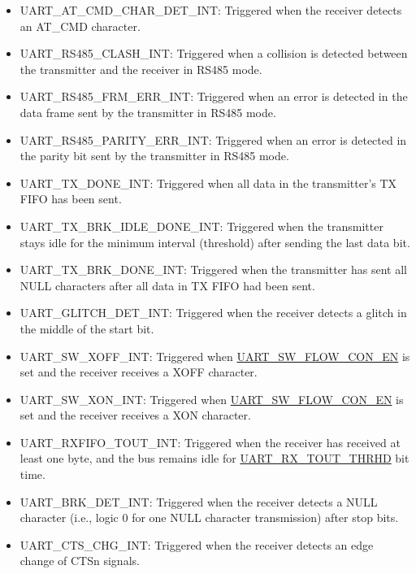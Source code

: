 \documentclass[main\_\_EN.tex]{subfiles}
\begin{document}
\begin{itemize}
\item \label{int:UARTATCMDCHARDETINT}UART\_AT\_CMD\_CHAR\_DET\_INT: Triggered when the receiver detects an AT\_CMD character.
\item \label{int:UARTRS485CLASHINT}UART\_RS485\_CLASH\_INT: Triggered when a collision is detected between the transmitter and the receiver in RS485 mode.
\item \label{int:UARTRS485FRMERRINT}UART\_RS485\_FRM\_ERR\_INT: Triggered when an error is detected in the data frame sent by the transmitter in RS485 mode.
\item \label{int:UARTRS485PARITYERRINT}UART\_RS485\_PARITY\_ERR\_INT: Triggered when an error is detected in the parity bit sent by the transmitter in RS485 mode.
\item \label{int:UARTTXDONEINT}UART\_TX\_DONE\_INT: Triggered when all data in the transmitter's TX FIFO has been sent.
\item \label{int:UARTTXBRKIDLEDONEINT}UART\_TX\_BRK\_IDLE\_DONE\_INT: Triggered when the transmitter stays idle for the minimum interval (threshold) after sending the last data bit.
\item \label{int:UARTTXBRKDONEINT}UART\_TX\_BRK\_DONE\_INT: Triggered when the transmitter has sent all NULL characters after all data in TX FIFO had been sent.
\item \label{int:UARTGLITCHDETINT}UART\_GLITCH\_DET\_INT: Triggered when the receiver detects a glitch in the middle of the start bit.
\item \label{int:UARTSWXOFFINT}UART\_SW\_XOFF\_INT: Triggered when \hyperref[fielddesc:UARTSWFLOWCONEN]{UART\_SW\_FLOW\_CON\_EN} is set and the receiver receives a XOFF character.
\item \label{int:UARTSWXONINT}UART\_SW\_XON\_INT: Triggered when \hyperref[fielddesc:UARTSWFLOWCONEN]{UART\_SW\_FLOW\_CON\_EN} is set and the receiver receives a XON character.
\item \label{int:UARTRXFIFOTOUTINT}UART\_RXFIFO\_TOUT\_INT: Triggered when the receiver has received at least one byte, and the bus remains idle for \hyperref[fielddesc:UARTRXTOUTTHRHD]{UART\_RX\_TOUT\_THRHD} bit time.
\item \label{int:UARTBRKDETINT}UART\_BRK\_DET\_INT: Triggered when the receiver detects a NULL character (i.e., logic 0 for one NULL character transmission) after stop bits.
\item \label{int:UARTCTSCHGINT}UART\_CTS\_CHG\_INT: Triggered when the receiver detects an edge change of CTSn signals.

\end{itemize}
\end{document}
